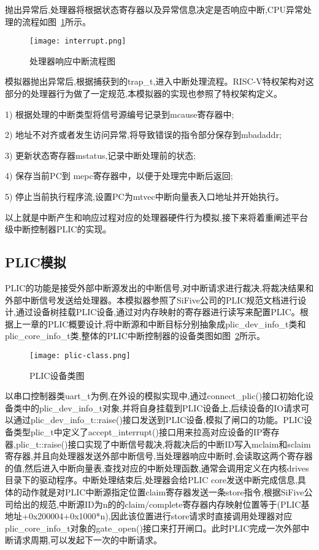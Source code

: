 抛出异常后,处理器将根据状态寄存器以及异常信息决定是否响应中断,CPU异常处理的流程如图~\ref{fig:interrupt}所示。
\begin{figure}[H]
    \centering
    \texttt{[image: interrupt.png]}
    \caption{处理器响应中断流程图}
    \label{fig:interrupt}
\end{figure}

模拟器抛出异常后,根据捕获到的trap\_t,进入中断处理流程。RISC-V特权架构对这部分的处理器行为做了一定规范,本模拟器的实现也参照了特权架构定义。


1) 根据处理的中断类型将信号源编号记录到mcause寄存器中;


2) 地址不对齐或者发生访问异常,将导致错误的指令部分保存到mbadaddr;


3) 更新状态寄存器mstatus,记录中断处理前的状态;


4) 保存当前PC到 mepc寄存器中，以便于处理完中断后返回;


5) 停止当前执行程序流,设置PC为mtvec中断向量表入口地址并开始执行。


以上就是中断产生和响应过程对应的处理器硬件行为模拟,接下来将着重阐述平台级中断控制器PLIC的实现。


\subsection{PLIC模拟}

PLIC的功能是接受外部中断源发出的中断信号,对中断请求进行裁决,将裁决结果和外部中断信号发送给处理器。本模拟器参照了SiFive公司的PLIC规范文档进行设计,通过设备树挂载PLIC设备,通过对内存映射的寄存器进行读写来配置PLIC。根据上一章的PLIC概要设计,将中断源和中断目标分别抽象成plic\_dev\_info\_t类和plic\_core\_info\_t类,整体的PLIC中断控制器的设备类图如图~\ref{fig:plic-class}所示。
\begin{figure}[H]
    \centering
    \texttt{[image: plic-class.png]}
    \caption{PLIC设备类图}
    \label{fig:plic-class}
\end{figure}
以串口控制器类uart\_t为例,在外设的模拟实现中,通过connect\_plic()接口初始化设备类中的plic\_dev\_info\_t对象,并将自身挂载到PLIC设备上,后续设备的IO请求可以通过plic\_dev\_info\_t::raise()接口发送到PLIC设备,模拟了闸口的功能。PLIC设备类型plic\_t中定义了accept\_interrupt()接口用来拉高对应设备的IP寄存器,plic\_t::raise()接口实现了中断信号裁决,将裁决后的中断ID写入mclaim和sclaim寄存器,并且向处理器发送外部中断信号,当处理器响应中断时,会读取这两个寄存器的值,然后进入中断向量表,查找对应的中断处理函数,通常会调用定义在内核drives目录下的驱动程序。中断处理结束后,处理器会给PLIC core发送中断完成信息,具体的动作就是对PLIC中断源指定位置claim寄存器发送一条store指令,根据SiFive公司给出的规范,中断源ID为n的的claim/complete寄存器内存映射位置等于(PLIC基地址+0x200004+0x1000*n),因此该位置进行store请求时直接调用处理器对应plic\_core\_info\_t对象的gate\_open()接口来打开闸口。此时PLIC完成一次外部中断请求周期,可以发起下一次的中断请求。




